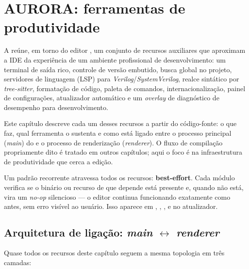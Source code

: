 \chapter{AURORA: ferramentas de produtividade}
\label{cap:13-aurora-produtividade}

A  reúne, em torno do editor , um conjunto de
recursos auxiliares que aproximam a IDE da experiência de um ambiente
profissional de desenvolvimento: um terminal de saída rico, controle de versão
embutido, busca global no projeto, servidores de linguagem (LSP) para
\textit{Verilog}/\textit{SystemVerilog}, realce sintático por
\textit{tree-sitter}, formatação de código, paleta de comandos,
internacionalização, painel de configurações, atualizador automático e um
\textit{overlay} de diagnóstico de desempenho para desenvolvimento.

Este capítulo descreve cada um desses recursos a partir do código-fonte: o que
faz, qual ferramenta o sustenta e como está ligado entre o processo principal
(\textit{main}) do  e o processo de renderização (\textit{renderer}).
O fluxo de compilação propriamente dito é tratado em outros capítulos; aqui o
foco é na infraestrutura de produtividade que cerca a edição.

\begin{nota}
Um padrão recorrente atravessa todos os recursos: \textbf{best-effort}. Cada
módulo verifica se o binário ou recurso de que depende está presente e, quando
não está, vira um \textit{no-op} silencioso — o editor continua funcionando
exatamente como antes, sem erro visível ao usuário. Isso aparece em
, , ,
 e no atualizador.
\end{nota}

\section{Arquitetura de ligação: \textit{main} $\leftrightarrow$ \textit{renderer}}
\label{sec:13-arquitetura-ligacao}

Quase todos os recursos deste capítulo seguem a mesma topologia em três
camadas:


